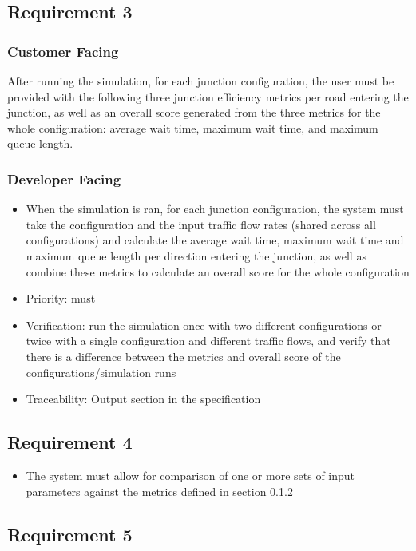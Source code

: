 \documentclass{article}
\begin{document}
\subsection{Requirement 3}
\subsubsection{Customer Facing}
After running the simulation, for each junction configuration, 
the user must be provided with the following three junction efficiency metrics 
per road entering the junction, as well as an overall score generated from the 
three metrics for the whole configuration: average wait time, maximum wait time, 
and maximum queue length.
\subsubsection{Developer Facing} \label{requirements_user}
\begin{itemize}
  \item When the simulation is ran, for each junction configuration, the system 
  must take the configuration and the input traffic flow rates (shared across all 
  configurations) and calculate the average wait time, maximum wait time and 
  maximum queue length per direction entering the junction, as well as combine 
  these metrics to calculate an overall score for the whole configuration
  \item Priority: must
  \item Verification: run the simulation once with two different configurations 
  or twice with a single configuration and different traffic flows, and verify 
  that there is a difference between the metrics and overall score of the 
  configurations/simulation runs
  \item Traceability: Output section in the specification
\end{itemize}

\subsection{Requirement 4}
\begin{itemize}
  \item The system must allow for comparison of one or more sets of input parameters against the metrics defined in section \ref{requirements_user}
\end{itemize}

\subsection{Requirement 5}
\end{document}
